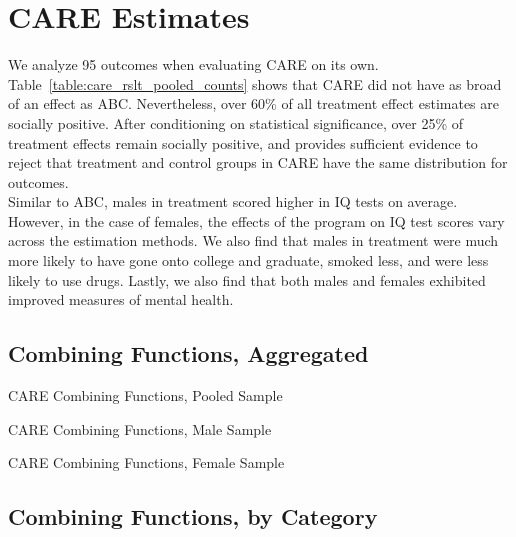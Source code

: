 \section{CARE Estimates}

\noindent We analyze 95 outcomes when evaluating CARE on its own. Table~\ref{table:care_rslt_pooled_counts} shows that CARE did not have as broad of an effect as ABC. Nevertheless, over 60\% of all treatment effect estimates are socially positive. After conditioning on statistical significance, over 25\% of treatment effects remain socially positive, and provides sufficient evidence to reject that treatment and control groups in CARE have the same distribution for outcomes. \\

\noindent Similar to ABC, males in treatment scored higher in IQ tests on average. However, in the case of females, the effects of the program on IQ test scores vary across the estimation methods. We also find that males in treatment were much more likely to have gone onto college and graduate, smoked less, and were less likely to use drugs. Lastly, we also find that both males and females exhibited improved measures of mental health. \\

\def\arraystretch{0.6}

\setlength\tabcolsep{0.3em}

\subsection{{Combining Functions, Aggregated}}


	\begin{table}[H]
     \caption{CARE Combining Functions, Pooled Sample}
     \label{table:care_rslt_pooled_counts} 
	
	\end{table}  

	\begin{table}[H]
     \caption{CARE Combining Functions, Male Sample} 
	
	\end{table}  

	\begin{table}[H]
     \caption{CARE Combining Functions, Female Sample} 
	
	\end{table}  
\clearpage

\subsection{{Combining Functions, by Category}}


